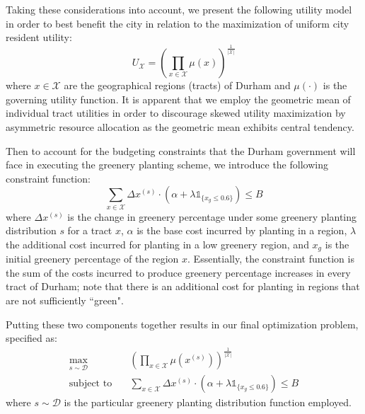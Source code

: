 \documentclass[11pt]{article}
\begin{document}
Taking these considerations into account, we present the following utility model in order to best benefit the city in relation to the  maximization of uniform city resident utility:
\begin{equation}
U_\mathcal{X} = \left( \prod_{x \in \mathcal{X}} \mu(x) \right)^\frac{1}{|\mathcal{X}|}
\end{equation}
where $x \in \mathcal{X}$ are the geographical regions (tracts) of Durham and $\mu(\cdot)$ is the governing utility function. It is apparent that we employ the geometric mean of individual tract utilities in order to discourage skewed utility maximization by asymmetric resource allocation as the geometric mean exhibits central tendency.

Then to account for the budgeting constraints that the Durham government will face in executing the greenery planting scheme, we introduce the following constraint function:
\begin{equation}
\sum_{x \in \mathcal{X}} \Delta x^{(s)} \cdot (\alpha + \lambda \mathds{1}_{\{x_{g} \leq 0.6\}}) \leq B
\end{equation}
where $\Delta x^{(s)}$ is the change in greenery percentage under some greenery planting distribution $s$ for a tract $x$, $\alpha$ is the base cost incurred by planting in a region, $\lambda$ the additional cost incurred for planting in a low greenery region, and $x_g$ is the initial greenery percentage of the region $x$. Essentially, the constraint function is the sum of the costs incurred to produce greenery percentage increases in every tract of Durham; note that there is an additional cost for planting in regions that are not sufficiently ``green".

Putting these two components together results in our final optimization problem, specified as:
\begin{equation}
\begin{aligned}
\max_{s \sim \mathcal{D}} \quad & \left( \prod_{x \in \mathcal{X}} \mu(x^{(s)}) \right)^\frac{1}{|\mathcal{X}|} \\
\textrm{subject to} \quad &\sum_{x \in \mathcal{X}} \Delta x^{(s)} \cdot (\alpha + \lambda \mathds{1}_{\{x_{g} \leq 0.6\}}) \leq B
\end{aligned}
\end{equation}
where $s \sim \mathcal{D}$ is the particular greenery planting distribution function employed.
\end{document}
